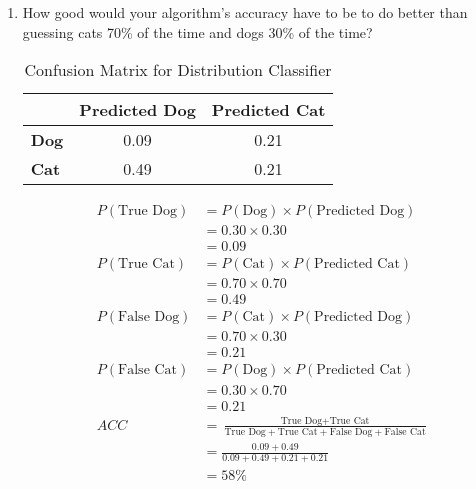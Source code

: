 \documentclass[12pt]{article}
\begin{document}
\begin{enumerate}
\begin{enumerate}
  \item How good would your algorithm's accuracy have to be to do better than guessing cats 70\% of the time and dogs 30\% of the time?
  \vspace{-1em}
    \begin{table}[h!]
      \begin{center}
          \caption{Confusion Matrix for Distribution Classifier}
          \label{tab:table2}
          \begin{tabular}{l|c|c}
            & \textbf{Predicted Dog} & \textbf{Predicted Cat} \\
            \hline
            \textbf{Dog} & 0.09 & 0.21 \\
            \textbf{Cat} & 0.49 & 0.21 \\
          \end{tabular}
      \end{center}
    \end{table}

    \vspace{-3em}

    \begin{align*}
      P(\text{True Dog}) &= P(\text{Dog}) \times P(\text{Predicted Dog})\\
        &= 0.30 \times 0.30\\
        &= 0.09\\
        P(\text{True Cat}) &= P(\text{Cat}) \times P(\text{Predicted Cat})\\
        &= 0.70 \times 0.70\\
        &= 0.49\\
      P(\text{False Dog}) &= P(\text{Cat}) \times P(\text{Predicted Dog})\\
        &= 0.70 \times 0.30\\
        &= 0.21\\
        P(\text{False Cat}) &= P(\text{Dog}) \times P(\text{Predicted Cat})\\
        &= 0.30 \times 0.70\\
        &= 0.21\\
        ACC &= \frac{\text{True Dog} + \text{True Cat}}{\text{True Dog} + \text{True Cat} + \text{False Dog} + \text{False Cat}}\\[8pt]
        &= \frac{0.09 + 0.49}{0.09 + 0.49 + 0.21 + 0.21}\\[8pt]
        &= \boxed{58\%}
  \end{align*}
  \end{enumerate}
\newpage


\end{enumerate}
\end{document}

